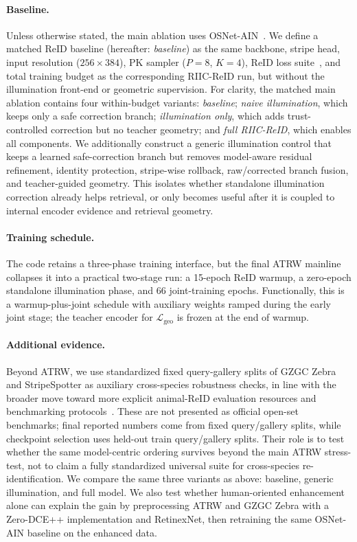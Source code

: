 \documentclass[sigconf,screen,review,anonymous]{acmart}
\begin{document}
\paragraph{Baseline.}
Unless otherwise stated, the main ablation uses
OSNet-AIN~\cite{zhou2021osnetain}.
We define a matched ReID baseline (hereafter: \emph{baseline}) as the same backbone, stripe head, input
resolution ($256{\times}384$), PK sampler ($P{=}8$, $K{=}4$), ReID loss
suite~\cite{luo2019bag,hermans2017triplet,deng2019arcface}, and total training
budget as the corresponding RIIC-ReID run, but without the illumination front-end
or geometric supervision.
For clarity, the matched main ablation contains four within-budget variants:
\emph{baseline}; \emph{naive illumination}, which keeps only a safe correction
branch; \emph{illumination only}, which adds trust-controlled correction but no
teacher geometry; and \emph{full RIIC-ReID}, which enables all components.
We additionally construct a generic illumination control that keeps a learned
safe-correction branch but removes model-aware residual refinement, identity
protection, stripe-wise rollback, raw/corrected branch fusion, and
teacher-guided geometry. This isolates whether standalone illumination
correction already helps retrieval, or only becomes useful after it is coupled
to internal encoder evidence and retrieval geometry.

\paragraph{Training schedule.}
The code retains a three-phase training interface, but the final ATRW mainline
collapses it into a practical two-stage run: a 15-epoch ReID warmup, a
zero-epoch standalone illumination phase, and 66 joint-training epochs.
Functionally, this is a warmup-plus-joint schedule with auxiliary weights
ramped during the early joint stage; the teacher encoder for
$\mathcal{L}_{\text{geo}}$ is frozen at the end of warmup.

\paragraph{Additional evidence.}
Beyond ATRW, we use standardized fixed query-gallery splits of GZGC Zebra and
StripeSpotter as auxiliary cross-species robustness checks, in line with the
broader move toward more explicit animal-ReID evaluation resources and
benchmarking protocols~\cite{cermak2024wildlifedatasets,adam2024seaturtleid,hou2025openanimals}.
These are not presented as official open-set benchmarks; final reported
numbers come from fixed query/gallery splits, while checkpoint selection uses
held-out train query/gallery splits.
Their role is to test whether the same model-centric ordering survives beyond
the main ATRW stress-test, not to claim a fully standardized universal suite
for cross-species re-identification.
We compare the same three variants as above: baseline, generic
illumination, and full model.
We also test whether human-oriented enhancement alone can explain the gain by
preprocessing ATRW and GZGC Zebra with a Zero-DCE++ implementation and
RetinexNet, then retraining the same OSNet-AIN baseline on the enhanced data.
\end{document}
